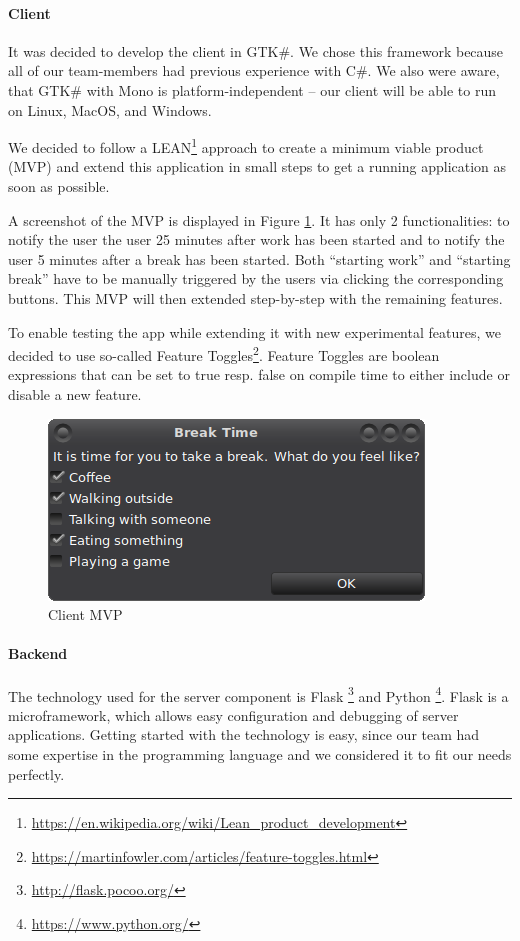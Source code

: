 

\paragraph{Client} It was decided to develop the client in GTK\#. We chose this framework because all of our team-members had previous experience with C\#. We also were aware, that GTK\# with Mono is platform-independent -- our client will be able to run on Linux, MacOS, and Windows.

We decided to follow a LEAN\footnote{\url{https://en.wikipedia.org/wiki/Lean_product_development}} approach to create a minimum viable product (MVP) and extend this application in small steps to get a running application as soon as possible.

A screenshot of the MVP is displayed in Figure \ref{fig:mvp-screenshot}. It has only 2 functionalities: to notify the user the user 25 minutes after work has been started and to notify the user 5 minutes after a break has been started. Both ``starting work'' and ``starting break'' have to be manually triggered by the users via clicking the corresponding buttons. This MVP will then extended step-by-step with the remaining features.

To enable testing the app while extending it with new experimental features, we decided to use so-called Feature Toggles\footnote{\url{https://martinfowler.com/articles/feature-toggles.html}}. Feature Toggles are boolean expressions that can be set to true resp. false on compile time to either include or disable a new feature.

\begin{figure}
  \centering
  \includegraphics{images/mvp-screenshot.png}
  \caption{Client MVP}
  \label{fig:mvp-screenshot}
\end{figure}

\paragraph{Backend}
The technology used for the server component is Flask \footnote{\url{http://flask.pocoo.org/}} and Python \footnote{\url{https://www.python.org/}}. Flask is a microframework, which allows easy configuration and debugging of server applications. Getting started with the technology is easy, since our team had some expertise in the programming language and we considered it to fit our needs perfectly. 

